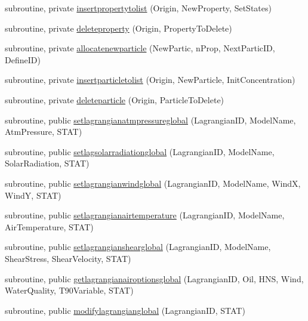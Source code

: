 \begin{DoxyCompactItemize}
\item 
subroutine, private \mbox{\hyperlink{namespacemodulelagrangianglobal_ad71ed77715b3249cc24c592dfcca2fc8}{insertpropertytolist}} (Origin, New\+Property, Set\+States)
\item 
subroutine, private \mbox{\hyperlink{namespacemodulelagrangianglobal_af269f1bc18ee6db0ac6b2b6d27bc7499}{deleteproperty}} (Origin, Property\+To\+Delete)
\item 
subroutine, private \mbox{\hyperlink{namespacemodulelagrangianglobal_adf7a8f7c3f2d3dd4f0472f6d4d1ec56e}{allocatenewparticle}} (New\+Partic, n\+Prop, Next\+Partic\+ID, Define\+ID)
\item 
subroutine, private \mbox{\hyperlink{namespacemodulelagrangianglobal_a2d4644f4134b54b72e810da551bd14a9}{insertparticletolist}} (Origin, New\+Particle, Init\+Concentration)
\item 
subroutine, private \mbox{\hyperlink{namespacemodulelagrangianglobal_aef9b588fe6eb57b2059f4fd96df7bd7d}{deleteparticle}} (Origin, Particle\+To\+Delete)
\item 
subroutine, public \mbox{\hyperlink{namespacemodulelagrangianglobal_a98a63aa4ad8e0057fcd9682992e94c72}{setlagrangianatmpressureglobal}} (Lagrangian\+ID, Model\+Name, Atm\+Pressure, S\+T\+AT)
\item 
subroutine, public \mbox{\hyperlink{namespacemodulelagrangianglobal_a7a50386c8ebd93860ae227d772932cd8}{setlagsolarradiationglobal}} (Lagrangian\+ID, Model\+Name, Solar\+Radiation, S\+T\+AT)
\item 
subroutine, public \mbox{\hyperlink{namespacemodulelagrangianglobal_ac53f073d4f18ccb94ad14b1b035b9bd6}{setlagrangianwindglobal}} (Lagrangian\+ID, Model\+Name, WindX, WindY, S\+T\+AT)
\item 
subroutine, public \mbox{\hyperlink{namespacemodulelagrangianglobal_ae5f676580934f8f401128b976eca5807}{setlagrangianairtemperature}} (Lagrangian\+ID, Model\+Name, Air\+Temperature, S\+T\+AT)
\item 
subroutine, public \mbox{\hyperlink{namespacemodulelagrangianglobal_adc48b1a085b61254391390b4d5e28fa0}{setlagrangianshearglobal}} (Lagrangian\+ID, Model\+Name, Shear\+Stress, Shear\+Velocity, S\+T\+AT)
\item 
subroutine, public \mbox{\hyperlink{namespacemodulelagrangianglobal_ad61d5f10ce5c10c555891aa6da16a247}{getlagrangianairoptionsglobal}} (Lagrangian\+ID, Oil, H\+NS, Wind, Water\+Quality, T90\+Variable, S\+T\+AT)
\item 
subroutine, public \mbox{\hyperlink{namespacemodulelagrangianglobal_a658b1fd9232553dc9130f4f03e93e4c1}{modifylagrangianglobal}} (Lagrangian\+ID, S\+T\+AT)

\end{DoxyCompactItemize}
